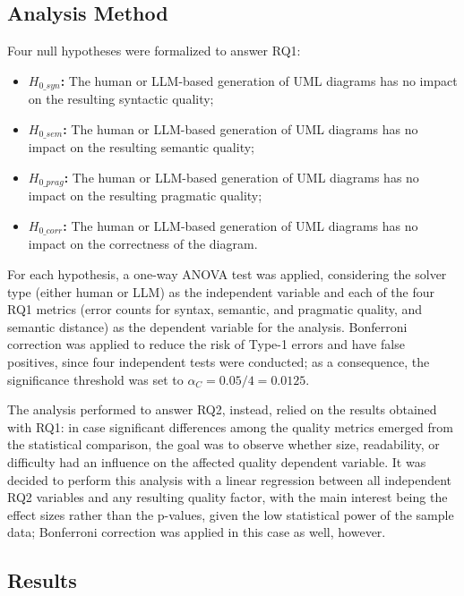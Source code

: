 \subsection{Analysis Method}

Four null hypotheses were formalized to answer RQ1:

\begin{itemize}
    \item \textbf{${H_{0\_{syn}}}$:} The human or LLM-based generation of UML diagrams has no impact on the resulting syntactic quality;
    \item \textbf{${H_{0\_{sem}}}$:} The human or LLM-based generation of UML diagrams has no impact on the resulting semantic quality;
    \item \textbf{${H_{0\_{prag}}}$:} The human or LLM-based generation of UML diagrams has no impact on the resulting pragmatic quality;
    \item \textbf{${H_{0\_{corr}}}$:} The human or LLM-based generation of UML diagrams has no impact on the correctness of the diagram.
\end{itemize}

For each hypothesis, a one-way ANOVA test was applied, considering the solver type (either human or LLM) as the independent variable and each of the four RQ1 metrics (error counts for syntax, semantic, and pragmatic quality, and semantic distance) as the dependent variable for the analysis. Bonferroni correction was applied to reduce the risk of Type-1 errors and have false positives, since four independent tests were conducted; as a consequence, the significance threshold was set to $\alpha_C = 0.05/4 = 0.0125$.

The analysis performed to answer RQ2, instead, relied on the results obtained with RQ1: in case significant differences among the quality metrics emerged from the statistical comparison, the goal was to observe whether size, readability, or difficulty had an influence on the affected quality dependent variable. It was decided to perform this analysis with a linear regression between all independent RQ2 variables and any resulting quality factor, with the main interest being the effect sizes rather than the p-values, given the low statistical power of the sample data; Bonferroni correction was applied in this case as well, however.


\subsection{Results}

